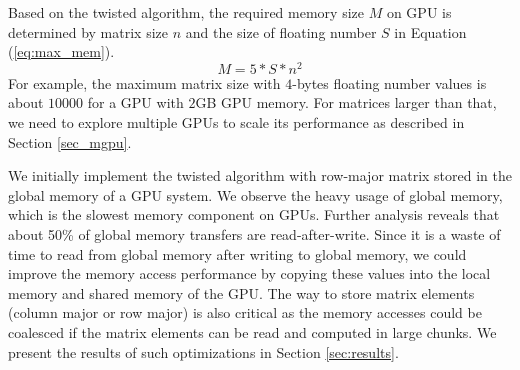 Based on the twisted algorithm, the required memory size $M$ on GPU is determined by matrix size $n$ and the size of floating number $S$ in Equation (\ref{eq:max_mem}).
\begin{equation}
M = 5 * S * n^2
\label{eq:max_mem}
\end{equation}
For example, the maximum matrix size with $4$-bytes floating number values is about $10000$ for a GPU with $2$GB GPU memory. For matrices larger than that, we need to explore multiple GPUs to scale its performance as described in Section \ref{sec_mgpu}.

We initially implement the twisted algorithm with row-major matrix stored in the global memory
of a GPU system. 
We observe the heavy usage of global memory, which is
the slowest memory component on GPUs. 
Further analysis reveals that about 50\% of global memory transfers are read-after-write. Since it is a waste of time to read from global memory after writing to global memory,
we could improve the memory access performance by copying these values into the local memory and shared memory of the GPU.
The way to store matrix elements (column major or row major) is also critical as the memory accesses could be coalesced if the matrix elements
can be read and computed in large chunks. We present the results
of such optimizations in Section \ref{sec:results}.

